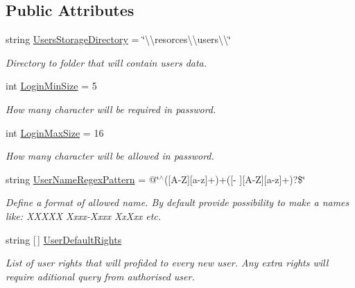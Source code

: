 \subsection*{Public Attributes}
\begin{DoxyCompactItemize}
\item 
string \mbox{\hyperlink{class_authority_controller_1_1_data_1_1_config_a7572d82972fd94d042784a220f3afef1}{Users\+Storage\+Directory}} = \char`\"{}\textbackslash{}\textbackslash{}resorces\textbackslash{}\textbackslash{}users\textbackslash{}\textbackslash{}\char`\"{}
\begin{DoxyCompactList}\small\item\em Directory to folder that will contain users data. \end{DoxyCompactList}\item 
int \mbox{\hyperlink{class_authority_controller_1_1_data_1_1_config_af6a0b4ee235de5375653b75b049a4ade}{Login\+Min\+Size}} = 5
\begin{DoxyCompactList}\small\item\em How many character will be required in password. \end{DoxyCompactList}\item 
int \mbox{\hyperlink{class_authority_controller_1_1_data_1_1_config_aee789851ddd9ca2f541b74a00eb88e6d}{Login\+Max\+Size}} = 16
\begin{DoxyCompactList}\small\item\em How many character will be allowed in password. \end{DoxyCompactList}\item 
string \mbox{\hyperlink{class_authority_controller_1_1_data_1_1_config_a224ad61312be50270d71e0d65633437c}{User\+Name\+Regex\+Pattern}} = @\char`\"{}$^\wedge$(\mbox{[}A-\/Z\mbox{]}\mbox{[}a-\/z\mbox{]}+)+(\mbox{[}-\/\textquotesingle{} \mbox{]}\mbox{[}A-\/Z\mbox{]}\mbox{[}a-\/z\mbox{]}+)?\$\char`\"{}
\begin{DoxyCompactList}\small\item\em Define a format of allowed name. By default provide possibility to make a names like\+: X\+X\+X\+XX Xxxx-\/\+Xxxx Xx\textquotesingle{}Xxx etc. \end{DoxyCompactList}\item 
string \mbox{[}$\,$\mbox{]} \mbox{\hyperlink{class_authority_controller_1_1_data_1_1_config_a084ad964d1a25e70e5a4e88cca031cbf}{User\+Default\+Rights}}
\begin{DoxyCompactList}\small\item\em List of user rights that will profided to every new user. Any extra rights will require aditional query from authorised user. \end{DoxyCompactList}\item 

\end{DoxyCompactItemize}
